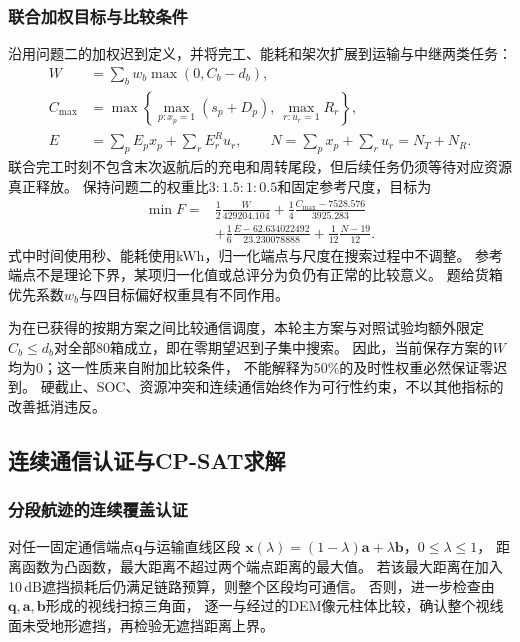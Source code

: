 \subsubsection{联合加权目标与比较条件}
沿用问题二的加权迟到定义，并将完工、能耗和架次扩展到运输与中继两类任务：
\begin{equation}
 \begin{aligned}
 W&=\sum_bw_b\max(0,C_b-d_b),\\
 C_{\max}&=\max\!\left\{\max_{p:x_p=1}(s_p+D_p),\ \max_{r:u_r=1}R_r\right\},\\
 E&=\sum_pE_px_p+\sum_rE_r^Ru_r,\qquad
 N=\sum_px_p+\sum_ru_r=N_T+N_R.
 \end{aligned}
 \label{eq:q3-objectives}
\end{equation}
联合完工时刻不包含末次返航后的充电和周转尾段，但后续任务仍须等待对应资源真正释放。
保持问题二的权重比$3:1.5:1:0.5$和固定参考尺度，目标为
\begin{equation}
 \begin{aligned}
 \min F={}&\frac12\frac{W}{429204.104}
 +\frac14\frac{C_{\max}-7528.576}{3925.283}\\
 &+\frac16\frac{E-62.634022492}{23.230078888}
 +\frac1{12}\frac{N-19}{12}.
 \end{aligned}
 \label{eq:q3-weighted}
\end{equation}
式中时间使用秒、能耗使用kWh，归一化端点与尺度在搜索过程中不调整。
参考端点不是理论下界，某项归一化值或总评分为负仍有正常的比较意义。
题给货箱优先系数$w_b$与四目标偏好权重具有不同作用。

为在已获得的按期方案之间比较通信调度，本轮主方案与对照试验均额外限定
$C_b\le d_b$对全部80箱成立，即在零期望迟到子集中搜索。
因此，当前保存方案的$W$均为0；这一性质来自附加比较条件，
不能解释为50\%的及时性权重必然保证零迟到。
硬截止、SOC、资源冲突和连续通信始终作为可行性约束，不以其他指标的改善抵消违反。

\subsection{连续通信认证与CP-SAT求解}
\subsubsection{分段航迹的连续覆盖认证}
对任一固定通信端点$\boldsymbol q$与运输直线区段
$\boldsymbol x(\lambda)=(1-\lambda)\boldsymbol a+\lambda\boldsymbol b$，$0\le\lambda\le1$，
距离函数为凸函数，最大距离不超过两个端点距离的最大值。
若该最大距离在加入10\,dB遮挡损耗后仍满足链路预算，则整个区段均可通信。
否则，进一步检查由$\boldsymbol q,\boldsymbol a,\boldsymbol b$形成的视线扫掠三角面，
逐一与经过的DEM像元柱体比较，确认整个视线面未受地形遮挡，再检验无遮挡距离上界。

